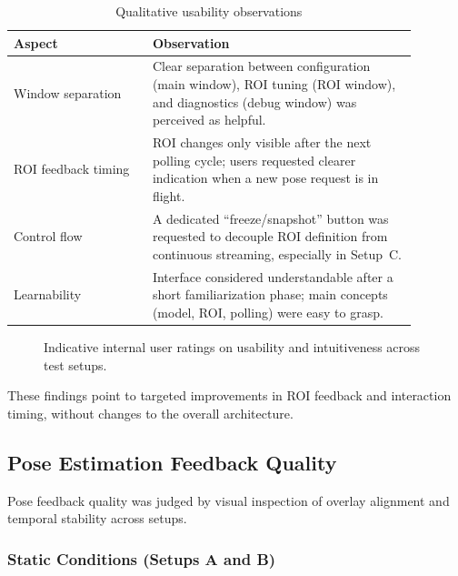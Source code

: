 \begin{table}[H]
    \centering
    \caption{Qualitative usability observations}
    \label{tab:ux-findings-eval}
    \begin{tabular}{p{0.30\linewidth}p{0.58\linewidth}}
        \toprule
        \textbf{Aspect} & \textbf{Observation} \\
        \midrule
        Window separation &
        Clear separation between configuration (main window), ROI tuning (ROI window), and diagnostics (debug window) was perceived as helpful. \\
        ROI feedback timing &
        ROI changes only visible after the next polling cycle; users requested clearer indication when a new pose request is in flight. \\
        Control flow &
        A dedicated “freeze/snapshot” button was requested to decouple ROI definition from continuous streaming, especially in Setup~C. \\
        Learnability &
        Interface considered understandable after a short familiarization phase; main concepts (model, ROI, polling) were easy to grasp. \\
        \bottomrule
    \end{tabular}
\end{table}

\begin{figure}[H]
    \centering
    \caption[User ratings on usability and intuitiveness]{Indicative internal user ratings on usability and intuitiveness across test setups.}
    \label{fig:uxratings}
\end{figure}

These findings point to targeted improvements in ROI feedback and interaction timing, without changes to the overall architecture.

\subsection{Pose Estimation Feedback Quality}

Pose feedback quality was judged by visual inspection of overlay alignment and temporal stability across setups.

\subsubsection{Static Conditions (Setups A and B)}

